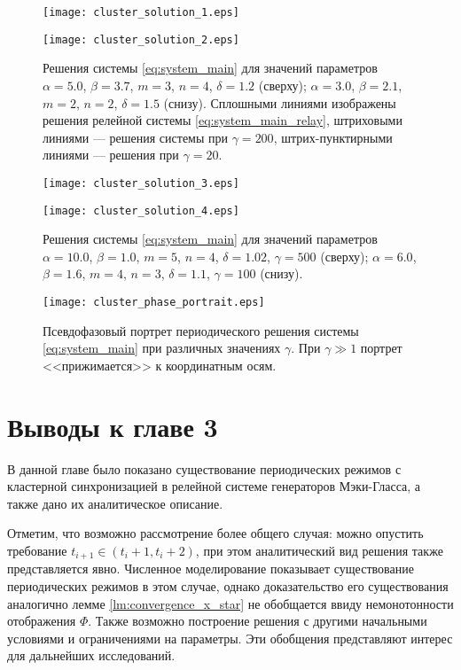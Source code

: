 \begin{figure}[!htb]
	\centering
	
	\texttt{[image: cluster\_solution\_1.eps]}
	
	\smallskip
	
	\texttt{[image: cluster\_solution\_2.eps]}
	
	\caption{Решения системы \eqref{eq:system_main} для значений параметров $\alpha = 5.0$, $\beta = 3.7$, $m = 3$, $n = 4$, $\delta = 1.2$  (сверху); $\alpha = 3.0$, $\beta = 2.1$, $m = 2$, $n = 2$, $\delta = 1.5$ (снизу). Сплошными линиями изображены решения релейной системы \eqref{eq:system_main_relay}, штриховыми линиями --- решения системы при $\gamma = 200$, штрих-пунктирными линиями --- решения при $\gamma = 20$.
	}
	\label{fig:cluster_solution}
\end{figure}

\begin{figure}[!htb]
	\centering
	\texttt{[image: cluster\_solution\_3.eps]}
	
	\smallskip
	
	\texttt{[image: cluster\_solution\_4.eps]}
	
	\caption{Решения системы \eqref{eq:system_main} для значений параметров $\alpha = 10.0$, $\beta = 1.0$, $m = 5$, $n = 4$, $\delta = 1.02$, $\gamma = 500$ (сверху); $\alpha = 6.0$, $\beta = 1.6$, $m = 4$, $n = 3$, $\delta = 1.1$, $\gamma = 100$ (снизу).}
	\label{fig:cluster_solution2}
\end{figure}

\begin{figure}[!htb]
	\centering
	\texttt{[image: cluster\_phase\_portrait.eps]}
	\caption{Псевдофазовый портрет периодического решения системы \eqref{eq:system_main} при различных значениях $\gamma$. При $\gamma \gg 1$ портрет <<прижимается>> к координатным осям.}
	\label{fig:phase_portrait}
\end{figure} 

\section{Выводы к главе 3}\label{sec:ch3/sect6}
В данной главе было показано существование периодических режимов с кластерной синхронизацией в релейной системе генераторов Мэки-Гласса, а также дано их аналитическое описание.

Отметим, что возможно рассмотрение более общего случая: можно опустить требование $t_{i + 1} \in (t_{i} + 1, t_{i} + 2)$, при этом аналитический вид решения также представляется явно. Численное моделирование показывает существование периодических режимов в этом случае, однако доказательство его существования аналогично лемме \ref{lm:convergence_x_star} не обобщается ввиду немонотонности отображения $\Phi$. Также возможно построение решения с другими начальными условиями и ограничениями на параметры. Эти обобщения представляют интерес для дальнейших исследований.
